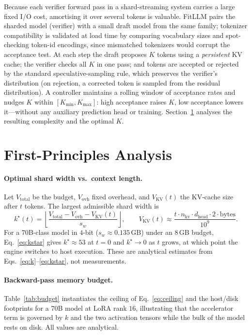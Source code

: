 \documentclass{article}
\begin{document}
Because each verifier forward pass in a shard-streaming system carries a large
fixed I/O cost, amortising it over several tokens is valuable. FitLLM pairs the
sharded model (verifier) with a small draft model from the same family; tokenizer
compatibility is validated at load time by comparing vocabulary sizes and
spot-checking token-id encodings, since mismatched tokenizers would corrupt the
acceptance test. At each step the draft proposes $K$ tokens using a
\emph{persistent} KV cache; the verifier checks all $K$ in one pass; and tokens
are accepted or rejected by the standard speculative-sampling rule, which
preserves the verifier's distribution (on rejection, a corrected token is sampled
from the residual distribution). A controller maintains a rolling window of
acceptance rates and nudges $K$ within $[K_{\min},K_{\max}]$: high acceptance
raises $K$, low acceptance lowers it---without any auxiliary prediction head or
training. Section~\ref{sec:analysis} analyses the resulting complexity and the
optimal $K$.

\section{First-Principles Analysis}
\label{sec:analysis}

\paragraph{Optimal shard width vs.\ context length.}
Let $V_{\mathrm{total}}$ be the budget, $V_{\mathrm{ovh}}$ fixed overhead, and
$V_{\mathrm{KV}}(t)$ the KV-cache size after $t$ tokens. The largest admissible
shard width is
\begin{equation}
  k^\star(t) = \left\lfloor \frac{V_{\mathrm{total}} - V_{\mathrm{ovh}} - V_{\mathrm{KV}}(t)}{s_w} \right\rfloor,
  \qquad
  V_{\mathrm{KV}}(t) \approx \frac{t \cdot n_{\mathrm{kv}} \cdot d_{\mathrm{head}} \cdot 2 \cdot \mathrm{bytes}}{10^9}.
  \label{eq:kstar}
\end{equation}
For a $70$B-class model in $4$-bit ($s_w\!\approx\!0.135$\,GB) under an $8$\,GB
budget, Eq.~\eqref{eq:kstar} gives $k^\star\!\approx\!53$ at $t=0$ and
$k^\star\!\to\!0$ as $t$ grows, at which point the engine switches to host
execution. These are analytical estimates from
Eqs.~\eqref{eq:k}--\eqref{eq:kstar}, not measurements.

\paragraph{Backward-pass memory budget.}
Table~\ref{tab:budget} instantiates the ceiling of Eq.~\eqref{eq:ceiling} and the
host/disk footprints for a $70$B model at LoRA rank $16$, illustrating that the
accelerator term is governed by $k$ and the two activation tensors while the bulk
of the model rests on disk. All values are analytical.
\end{document}
